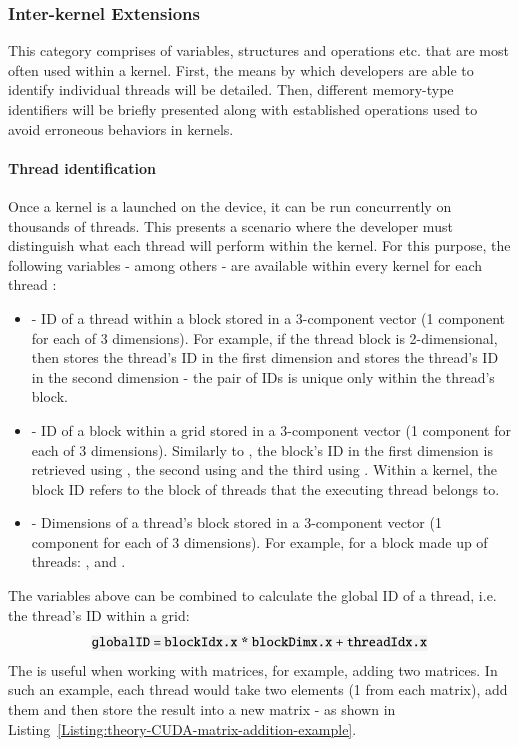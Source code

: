 \subsubsection{Inter-kernel Extensions}\label{Subsubsection:theory-CUDA-C++-extensions-inter-kernel-extensions}
This category comprises of variables, structures and operations etc. that are most often used within a kernel. First, the means by which developers are able to identify individual threads will be detailed. Then, different memory-type identifiers will be briefly presented along with established operations used to avoid erroneous behaviors in kernels.

\paragraph{Thread identification}
Once a kernel is a launched on the device, it can be run concurrently on thousands of threads. This presents a scenario where the developer must distinguish what each thread will perform within the kernel. For this purpose, the following variables - among others - are available within every kernel for each thread \cite{NVIDIAMay2022}:

\begin{itemize}
	\item {} - ID of a thread within a block stored in a 3-component vector (1 component for each of 3 dimensions). For example, if the thread block is 2-dimensional, then  stores the thread's ID in the first dimension and  stores the thread's ID in the second dimension - the pair of IDs is unique only within the thread's block.
	\item {} - ID of a block within a grid stored in a 3-component vector (1 component for each of 3 dimensions). Similarly to , the block's ID in the first dimension is retrieved using , the second using  and the third using . Within a kernel, the block ID refers to the block of threads that the executing thread belongs to.
	\item {} - Dimensions of a thread's block stored in a 3-component vector (1 component for each of 3 dimensions). For example, for a block made up of  threads: ,  and .
\end{itemize}

The variables above can be combined to calculate the global ID of a thread, i.e. the thread's ID within a grid:
$$\code{globalID = blockIdx.x * blockDimx.x + threadIdx.x}$$
The  is useful when working with matrices, for example, adding two matrices. In such an example, each thread would take two elements (1 from each matrix), add them and then store the result into a new matrix - as shown in Listing~\ref{Listing:theory-CUDA-matrix-addition-example}.

